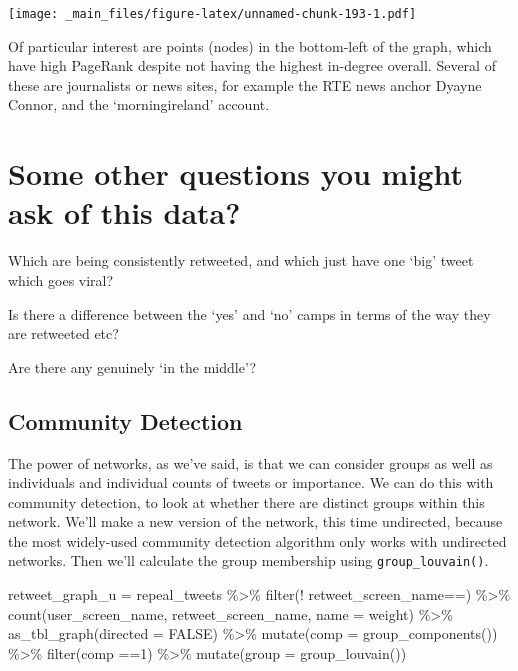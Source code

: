 \documentclass[
]{book}
\newenvironment{Shaded}{\begin{snugshade}}{\end{snugshade}}
\newcommand{\AttributeTok}[1]{\textcolor[rgb]{0.77,0.63,0.00}{#1}}
\newcommand{\ConstantTok}[1]{\textcolor[rgb]{0.00,0.00,0.00}{#1}}
\newcommand{\DecValTok}[1]{\textcolor[rgb]{0.00,0.00,0.81}{#1}}
\newcommand{\FunctionTok}[1]{\textcolor[rgb]{0.00,0.00,0.00}{#1}}
\newcommand{\NormalTok}[1]{#1}
\newcommand{\OtherTok}[1]{\textcolor[rgb]{0.56,0.35,0.01}{#1}}
\newcommand{\SpecialCharTok}[1]{\textcolor[rgb]{0.00,0.00,0.00}{#1}}
\newcommand{\StringTok}[1]{\textcolor[rgb]{0.31,0.60,0.02}{#1}}
\begin{document}
\texttt{[image: \_main\_files/figure-latex/unnamed-chunk-193-1.pdf]}

Of particular interest are points (nodes) in the bottom-left of the graph, which have high PageRank despite not having the highest in-degree overall. Several of these are journalists or news sites, for example the RTE news anchor Dyayne Connor, and the `morningireland' account.

\hypertarget{some-other-questions-you-might-ask-of-this-data}{%
\section{Some other questions you might ask of this data?}\label{some-other-questions-you-might-ask-of-this-data}}

Which are being consistently retweeted, and which just have one `big' tweet which goes viral?

Is there a difference between the `yes' and `no' camps in terms of the way they are retweeted etc?

Are there any genuinely `in the middle'?

\hypertarget{community-detection}{%
\subsection{Community Detection}\label{community-detection}}

The power of networks, as we've said, is that we can consider groups as well as individuals and individual counts of tweets or importance. We can do this with community detection, to look at whether there are distinct groups within this network. We'll make a new version of the network, this time undirected, because the most widely-used community detection algorithm only works with undirected networks. Then we'll calculate the group membership using \texttt{group\_louvain()}.

\begin{Shaded}
\begin{Highlighting}[]
\NormalTok{retweet\_graph\_u }\OtherTok{=}\NormalTok{ repeal\_tweets }\SpecialCharTok{\%\textgreater{}\%} 
  \FunctionTok{filter}\NormalTok{(}\SpecialCharTok{!}\NormalTok{ retweet\_screen\_name}\SpecialCharTok{==}\StringTok{\textquotesingle{}\textquotesingle{}}\NormalTok{) }\SpecialCharTok{\%\textgreater{}\%} 
  \FunctionTok{count}\NormalTok{(user\_screen\_name, retweet\_screen\_name, }\AttributeTok{name =} \StringTok{\textquotesingle{}weight\textquotesingle{}}\NormalTok{) }\SpecialCharTok{\%\textgreater{}\%} 
  \FunctionTok{as\_tbl\_graph}\NormalTok{(}\AttributeTok{directed =} \ConstantTok{FALSE}\NormalTok{) }\SpecialCharTok{\%\textgreater{}\%} \FunctionTok{mutate}\NormalTok{(}\AttributeTok{comp =} \FunctionTok{group\_components}\NormalTok{()) }\SpecialCharTok{\%\textgreater{}\%} \FunctionTok{filter}\NormalTok{(comp }\SpecialCharTok{==}\DecValTok{1}\NormalTok{) }\SpecialCharTok{\%\textgreater{}\%} 
  \FunctionTok{mutate}\NormalTok{(}\AttributeTok{group =} \FunctionTok{group\_louvain}\NormalTok{()) }
\end{Highlighting}
\end{Shaded}
\end{document}

